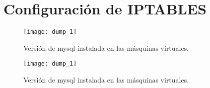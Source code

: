 \chapter{Configuración de IPTABLES}


\begin{figure}[h!]
\begin{center}
\caption{Versión de mysql instalada en las másquinas virtuales.}
\label{dump_1}
\texttt{[image: dump\_1]}
\end{center}
\end{figure}

\begin{figure}[h!]
\begin{center}
\caption{Versión de mysql instalada en las másquinas virtuales.}
\label{dump_1}
\texttt{[image: dump\_1]}
\end{center}
\end{figure}

